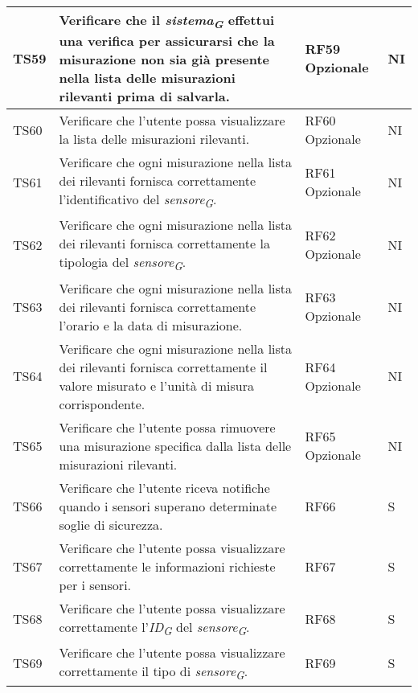 \begin{longtable}{|C{1.9cm}|L{5cm}|C{2cm}|C{2cm}|}
    TS59 & Verificare che il \textit{sistema}\textsubscript{\textit{G}} effettui una verifica per assicurarsi che la misurazione non sia già presente nella lista delle misurazioni rilevanti prima di salvarla. & RF59 Opzionale & NI \\
    \hline

    TS60 & Verificare che l'utente possa visualizzare la lista delle misurazioni rilevanti. & RF60 Opzionale & NI \\
    \hline

    TS61 & Verificare che ogni misurazione nella lista dei rilevanti fornisca correttamente l'identificativo del \textit{sensore}\textsubscript{\textit{G}}. & RF61 Opzionale & NI \\
    \hline

    TS62 & Verificare che ogni misurazione nella lista dei rilevanti fornisca correttamente la tipologia del \textit{sensore}\textsubscript{\textit{G}}. & RF62 Opzionale & NI \\
    \hline

    TS63 & Verificare che ogni misurazione nella lista dei rilevanti fornisca correttamente l'orario e la data di misurazione. & RF63 Opzionale & NI \\
    \hline

    TS64 & Verificare che ogni misurazione nella lista dei rilevanti fornisca correttamente il valore misurato e l'unità di misura corrispondente. & RF64 Opzionale & NI \\
    \hline

    TS65 & Verificare che l'utente possa rimuovere una misurazione specifica dalla lista delle misurazioni rilevanti. & RF65 Opzionale & NI \\
    \hline

    TS66 & Verificare che l'utente riceva notifiche quando i sensori superano determinate soglie di sicurezza. & RF66 & S \\
    \hline

    TS67 & Verificare che l'utente possa visualizzare correttamente le informazioni richieste per i sensori. & RF67 & S \\
    \hline

    TS68 & Verificare che l'utente possa visualizzare correttamente l'\textit{ID}\textsubscript{\textit{G}} del \textit{sensore}\textsubscript{\textit{G}}. & RF68 & S \\
    \hline

    TS69 & Verificare che l'utente possa visualizzare correttamente il tipo di \textit{sensore}\textsubscript{\textit{G}}. & RF69 & S \\
    \hline


\end{longtable}
